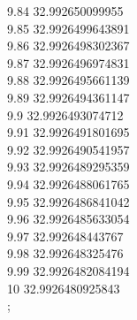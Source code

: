 {9.84	32.992650099955\\
9.85	32.9926499643891\\
9.86	32.9926498302367\\
9.87	32.9926496974831\\
9.88	32.9926495661139\\
9.89	32.9926494361147\\
9.9	32.9926493074712\\
9.91	32.9926491801695\\
9.92	32.9926490541957\\
9.93	32.9926489295359\\
9.94	32.9926488061765\\
9.95	32.9926486841042\\
9.96	32.9926485633054\\
9.97	32.992648443767\\
9.98	32.992648325476\\
9.99	32.9926482084194\\
10	32.9926480925843\\
};